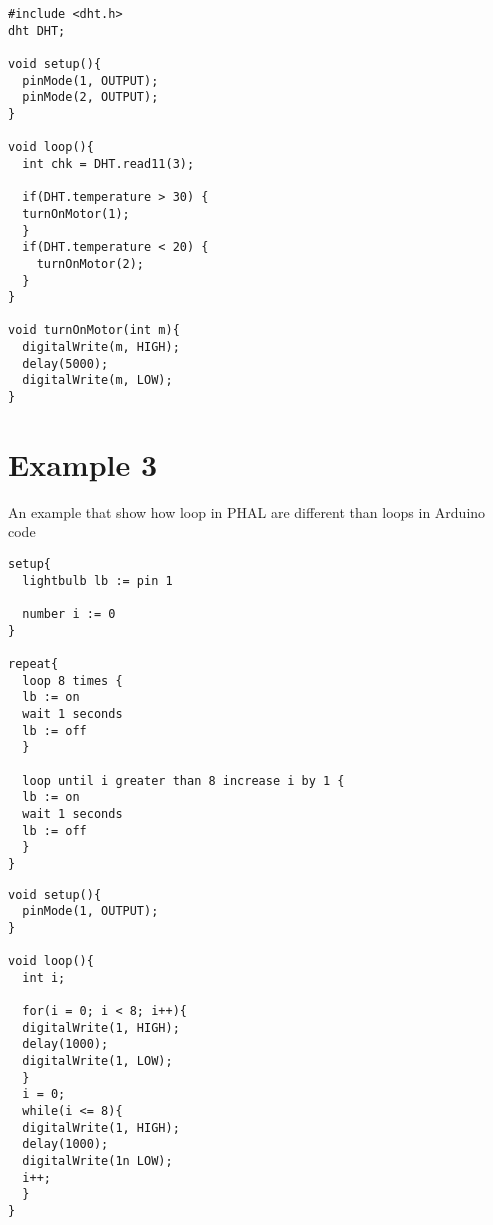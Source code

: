 \begin{lstlisting}[caption={Code example 2 in Arduino}, label={code:code2Arduino0}]
#include <dht.h>
dht DHT;

void setup(){
  pinMode(1, OUTPUT);
  pinMode(2, OUTPUT);
}

void loop(){
  int chk = DHT.read11(3);
  
  if(DHT.temperature > 30) {
  turnOnMotor(1);
  }
  if(DHT.temperature < 20) {
    turnOnMotor(2);
  }
}

void turnOnMotor(int m){
  digitalWrite(m, HIGH);
  delay(5000);
  digitalWrite(m, LOW);
}
\end{lstlisting}
\section{Example 3}
An example that show how loop in PHAL are different than loops in Arduino code
\begin{lstlisting}[caption={Code example 3 in PHAL}, label={code:code3PHAL}]
setup{
  lightbulb lb := pin 1
 
  number i := 0
}

repeat{
  loop 8 times {
  lb := on
  wait 1 seconds
  lb := off
  }

  loop until i greater than 8 increase i by 1 {
  lb := on
  wait 1 seconds
  lb := off
  }
}
\end{lstlisting}

\begin{lstlisting}[caption={Code example 3 in Arduino}, label={code:code3Arduino}]
void setup(){
  pinMode(1, OUTPUT);
}

void loop(){
  int i;
  
  for(i = 0; i < 8; i++){
  digitalWrite(1, HIGH);
  delay(1000);
  digitalWrite(1, LOW);
  }
  i = 0;
  while(i <= 8){
  digitalWrite(1, HIGH);
  delay(1000);
  digitalWrite(1n LOW);
  i++;
  }
}
\end{lstlisting}
 


